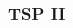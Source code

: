 
\begin{frame}[fragile]
\frametitle{TSP II}
\begin{columns}[T]

\begin{column}{0.45\textwidth}

\end{column}

\pause
\begin{column}{0.45\textwidth}

\end{column}

\end{columns}
\end{frame}




